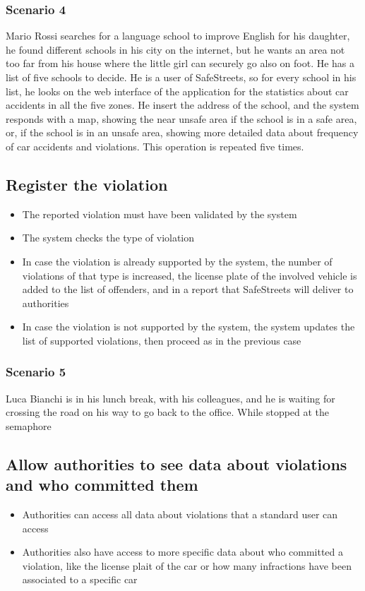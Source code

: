 \subsubsection{Scenario 4}
Mario Rossi searches for a language school to improve English for his daughter, he found different schools in his city on the internet, but he wants an area 
not too far from his house where the little girl can securely go also on foot. He has a list of five schools to decide. He is a user of SafeStreets, so 
for every school in his list, he looks on the web interface of the application for the statistics about car accidents in all the five zones. He insert the 
address of the school, and the system responds with a map, showing the near unsafe area if the school is in a safe area, or, if the school is in an unsafe 
area, showing more detailed data about frequency of car accidents and violations. This operation is repeated five times.

\subsection{Register the violation}
\begin{itemize}
    \item The reported violation must have been validated by the system
    \item The system checks the type of violation
    \item In case the violation is already supported by the system, the number of violations of that type is increased, the license plate of the involved vehicle is added to the list of offenders, and in a report that SafeStreets will deliver to authorities
    \item In case the violation is not supported by the system, the system updates the list of supported violations, then proceed as in the previous case
\end{itemize}
\subsubsection{Scenario 5}
Luca Bianchi is in his lunch break, with his colleagues, and he is waiting for crossing the road on his way to go back to the office. While stopped at the semaphore

\subsection{Allow authorities to see data about violations and who committed them}
\begin{itemize}
    \item Authorities can access all data about violations that a standard user can access
    \item Authorities also have access to more specific data about who committed a violation, like the license plait of the car or how many infractions have been associated to a specific car
\end{itemize}


